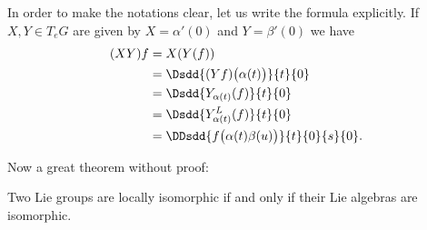 In order to make the notations clear, let us write the formula explicitly. If \( X,Y\in T_eG\) are given by \( X=\alpha'(0)\) and \( Y=\beta'(0)\) we have
\begin{subequations}        \label{SUBEQSooHKWMooQbeStl}
    \begin{align}
        (XY)f&=X(Y(f))\\
        &=\Dsdd{ (Yf)\big( \alpha(t) \big) }{t}{0}\\
        &=\Dsdd{ Y_{\alpha(t)}(f) }{t}{0}\\
        &=\Dsdd{ Y^L_{\alpha(t)}(f) }{t}{0}\\
        &=\DDsdd{ f\big( \alpha(t)\beta(u) \big) }{t}{0}{s}{0}.
    \end{align}
\end{subequations}

Now a great theorem without proof:
\begin{theorem} \label{tho:loc_isom}
Two Lie groups are locally isomorphic if and only if their Lie algebras are isomorphic.
\end{theorem}

